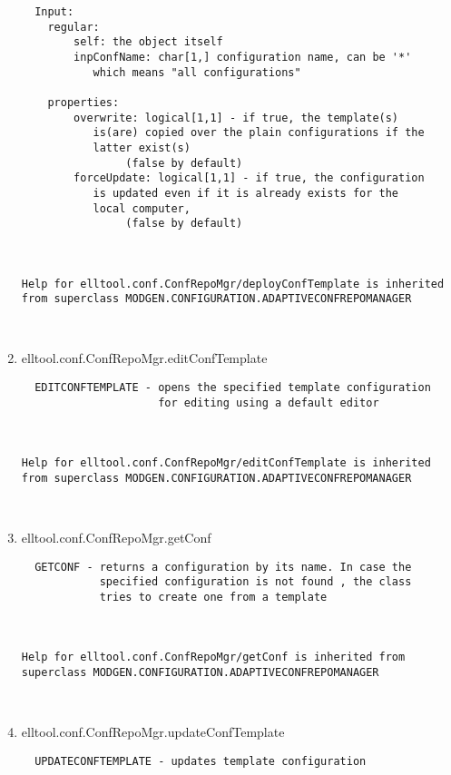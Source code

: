 \begin{enumerate}
\begin{lstlisting}
  Input:
    regular:
        self: the object itself
        inpConfName: char[1,] configuration name, can be '*'
           which means "all configurations"

    properties:
        overwrite: logical[1,1] - if true, the template(s)
           is(are) copied over the plain configurations if the
           latter exist(s)
                (false by default)
        forceUpdate: logical[1,1] - if true, the configuration
           is updated even if it is already exists for the
           local computer,
                (false by default)



Help for elltool.conf.ConfRepoMgr/deployConfTemplate is inherited from superclass MODGEN.CONFIGURATION.ADAPTIVECONFREPOMANAGER



\end{lstlisting}
\fontfamily{\familydefault}
\selectfont
\item {elltool.conf.ConfRepoMgr.editConfTemplate}
\selectfont
\begin{lstlisting}
  EDITCONFTEMPLATE - opens the specified template configuration
                     for editing using a default editor



Help for elltool.conf.ConfRepoMgr/editConfTemplate is inherited from superclass MODGEN.CONFIGURATION.ADAPTIVECONFREPOMANAGER



\end{lstlisting}
\fontfamily{\familydefault}
\selectfont
\item {elltool.conf.ConfRepoMgr.getConf}
\selectfont
\begin{lstlisting}
  GETCONF - returns a configuration by its name. In case the
            specified configuration is not found , the class
            tries to create one from a template



Help for elltool.conf.ConfRepoMgr/getConf is inherited from superclass MODGEN.CONFIGURATION.ADAPTIVECONFREPOMANAGER



\end{lstlisting}
\fontfamily{\familydefault}
\selectfont
\item {elltool.conf.ConfRepoMgr.updateConfTemplate}
\selectfont
\begin{lstlisting}
  UPDATECONFTEMPLATE - updates template configuration




\end{lstlisting}
\end{enumerate}
